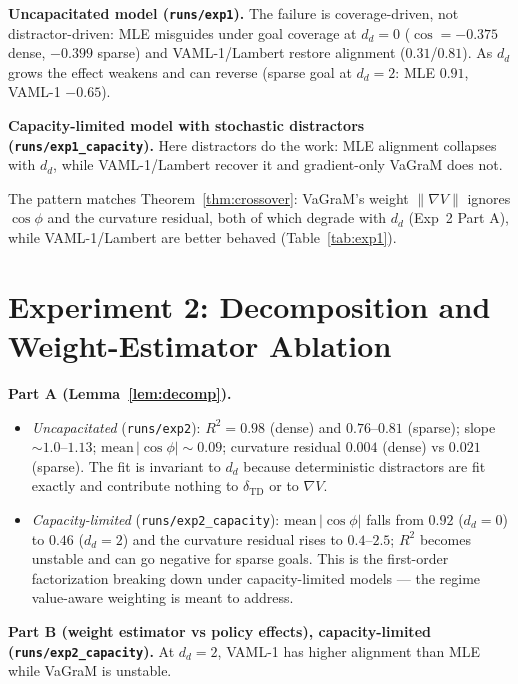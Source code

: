 \documentclass[11pt]{article}
\begin{document}
\textbf{Uncapacitated model (\texttt{runs/exp1}).} The failure is coverage-driven, not
distractor-driven: MLE misguides under goal coverage at $d_d = 0$
($\cos = -0.375$ dense, $-0.399$ sparse) and VAML-1/Lambert restore alignment
($0.31$/$0.81$). As $d_d$ grows the effect weakens and can reverse (sparse goal at
$d_d = 2$: MLE $0.91$, VAML-1 $-0.65$).

\textbf{Capacity-limited model with stochastic distractors (\texttt{runs/exp1\_capacity}).}
Here distractors do the work: MLE alignment collapses with $d_d$, while VAML-1/Lambert
recover it and gradient-only VaGraM does not.

The pattern matches Theorem~\ref{thm:crossover}: VaGraM's weight
$\lVert \nabla V\rVert$ ignores $\cos\phi$ and the curvature residual, both of which
degrade with $d_d$ (Exp~2 Part A), while VAML-1/Lambert are better behaved
(Table~\ref{tab:exp1}).



\section{Experiment 2: Decomposition and Weight-Estimator Ablation}

\textbf{Part A (Lemma~\ref{lem:decomp}).}
\begin{itemize}
\item \emph{Uncapacitated} (\texttt{runs/exp2}): $R^2 = 0.98$ (dense) and $0.76$--$0.81$
  (sparse); slope $\sim 1.0$--$1.13$; $\mathrm{mean}\,\lvert\cos\phi\rvert \sim 0.09$;
  curvature residual $0.004$ (dense) vs $0.021$ (sparse). The fit is invariant to $d_d$
  because deterministic distractors are fit exactly and contribute nothing to
  $\delta_{\mathrm{TD}}$ or to $\nabla V$.
\item \emph{Capacity-limited} (\texttt{runs/exp2\_capacity}):
  $\mathrm{mean}\,\lvert\cos\phi\rvert$ falls from $0.92$ ($d_d = 0$) to $0.46$
  ($d_d = 2$) and the curvature residual rises to $0.4$--$2.5$; $R^2$ becomes unstable
  and can go negative for sparse goals. This is the first-order factorization breaking
  down under capacity-limited models --- the regime value-aware weighting is meant to
  address.
\end{itemize}



\textbf{Part B (weight estimator vs policy effects), capacity-limited
(\texttt{runs/exp2\_capacity}).} At $d_d = 2$, VAML-1 has higher alignment than MLE
while VaGraM is unstable.
\end{document}

